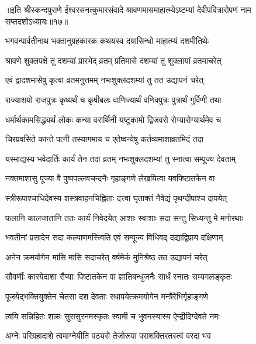 {॥इति श्रीस्कन्दपुराणे ईश्वरसनत्कुमारसंवादे श्रावणमासमाहात्म्येऽष्टम्यां देवीपवित्रारोपणं नाम सप्तदशोऽध्यायः॥१७॥}





\twolineshloka
{भगवन्पार्वतीनाथ भक्तानुग्रहकारक}
{कथयस्व दयासिन्धो माहात्म्यं दशमीतिथेः} %


\twolineshloka
{श्रावणे शुक्लपक्षे तु दशम्यां प्रारभेद् व्रतम्}
{प्रतिमासे दशम्यां तु शुक्लायां व्रतमाचरेत्} %

\twolineshloka
{एवं द्वादशमासेषु कृत्वा व्रतमनुत्तमम्}
{नभःशुक्लदशम्यां तु तत उद्यापनं चरेत्} %

\twolineshloka
{राज्याशयो राजपुत्रः कृष्यर्थं च कृषीबलः}
{वाणिज्यार्थं वणिक्पुत्रः पुत्रार्थं गुर्विणी तथा} %

\twolineshloka
{धर्मार्थकामसिद्ध्यर्थं लोकः कन्या वरार्थिनी}
{यष्टुकामो द्विजवरो रोग्यारोग्यार्थमेव च} %

\twolineshloka
{चिरप्रवसिते कान्ते पत्नी तस्यागमाय च}
{एतेष्वन्येषु कर्तव्यमाशाव्रतमिदं तदा} %

\twolineshloka
{यस्माद्यस्य भवेदार्तिः कार्यं तेन तदा व्रतम्}
{नभःशुक्लदशम्यां तु स्नात्वा सम्पूज्य देवताम्} %

\twolineshloka
{नक्तमाशासु पूज्या वै पुष्पपल्लवचन्दनैः}
{गृहाङ्गणे लेखयित्वा यवपिष्टातकेन वा} %

\twolineshloka
{स्त्रीरूपाश्चाधिदेवस्य शस्त्रवाहनचिह्निताः}
{दत्त्वा घृताक्तं नैवेद्यं पृथग्दीपांश्च दापयेत्} %

\twolineshloka
{फलानि कालजातानि ततः कार्यं निवेदयेत्}
{आशाः स्वाशाः सदा सन्तु सिध्यन्तु मे मनोरथाः} %

\twolineshloka
{भवतीनां प्रसादेन सदा कल्याणमस्त्विति}
{एवं सम्पूज्य विधिवद् दद्याद्विप्राय दक्षिणाम्} %

\twolineshloka
{अनेन क्रमयोगेन मासि मासि सदाचरेत्}
{वर्षमेकं मुनिश्रेष्ठ तत उद्यापनं चरेत्} %

\twolineshloka
{सौवर्णीः कारयेदाशा रौप्याः पिष्टातकेन वा}
{ज्ञातिबन्धुजनैः सार्धं स्नातः सम्यगलङ्कृतः} %

\twolineshloka
{पूजयेद्भक्तियुक्तेन चेतसा दश देवताः}
{स्थापयेत्क्रमयोगेन मन्त्रैरेभिर्गृहाङ्गणे} %

\twolineshloka
{त्वयि सन्निहितः शक्रः सुरासुरनमस्कृतः}
{स्वामी च भुवनस्यास्य ऐन्द्रीदिग्देवते नमः} %

\twolineshloka
{अग्नेः परिग्रहादाशे त्वमाग्नेयीति पठ्यसे}
{तेजोरूपा पराशक्तिरतस्त्वं वरदा भव} %

